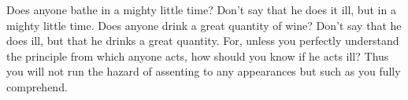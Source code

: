 Does anyone bathe in a mighty little time? Don't say that he does
it ill, but in a mighty little time. Does anyone drink a great quantity
of wine? Don't say that he does ill, but that he drinks a great quantity.
For, unless you perfectly understand the principle from which anyone
acts, how should you know if he acts ill? Thus you will not run the
hazard of assenting to any appearances but such as you fully comprehend.
